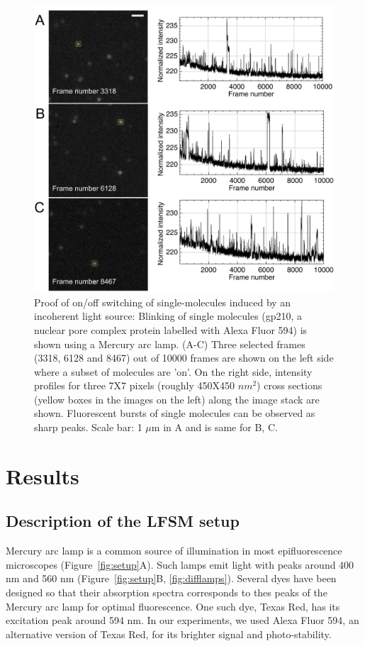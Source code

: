 \documentclass[9pt,twocolumn,twoside]{pnas-new}
\begin{document}
\begin{figure}[h!]
\begin{center}
\includegraphics[width=\linewidth]{Figures/Fig2.png}
\end{center}
\caption[]{Proof of on/off switching of single-molecules induced by an incoherent light source: Blinking of single molecules (gp210, a nuclear pore complex protein labelled with Alexa Fluor 594) is shown using a Mercury arc lamp. (A-C) Three selected frames (3318, 6128 and 8467) out of 10000 frames are shown on the left side where a subset of molecules are 'on'. On the right side, intensity profiles for three 7X7 pixels (roughly 450X450 $nm^2$) cross sections (yellow boxes in the images on the left) along the image stack are shown. Fluorescent bursts of single molecules can be observed as sharp peaks.
Scale bar: 1 $\mu$m in A and is same for B, C.} \label{fig:blinking}
\end{figure}


\section*{Results}
\subsection*{Description of the LFSM setup}
Mercury arc lamp is a common source of illumination in most epifluorescence microscopes (Figure~\ref{fig:setup}A). Such lamps emit light with peaks around 400 nm and 560 nm (Figure~\ref{fig:setup}B, \ref{fig:difflamps}). Several dyes have been designed so that their absorption spectra corresponds to thes peaks of the Mercury arc lamp for optimal fluorescence. One such dye, Texas Red, has its excitation peak around 594 nm. In our experiments, we used Alexa Fluor 594, an alternative version of Texas Red, for its brighter signal and photo-stability. 
\end{document}
